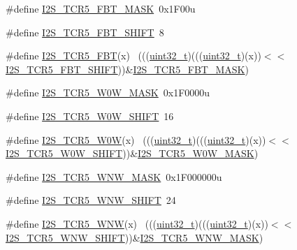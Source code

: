 \begin{DoxyCompactItemize}
\item 
\#define \hyperlink{group___i2_s___register___masks_ga95e32e5df1218cb76b09a99f46d9eca2}{I2\+S\+\_\+\+T\+C\+R5\+\_\+\+F\+B\+T\+\_\+\+M\+A\+SK}~0x1\+F00u
\item 
\#define \hyperlink{group___i2_s___register___masks_gaaeadb079b059ec5d832aa9bce021f0ab}{I2\+S\+\_\+\+T\+C\+R5\+\_\+\+F\+B\+T\+\_\+\+S\+H\+I\+FT}~8
\item 
\#define \hyperlink{group___i2_s___register___masks_ga4b64363766a6e27ad151e3f1c90eb537}{I2\+S\+\_\+\+T\+C\+R5\+\_\+\+F\+BT}(x)                                                ~(((\hyperlink{_p_e___types_8h_a33594304e786b158f3fb30289278f5af}{uint32\+\_\+t})(((\hyperlink{_p_e___types_8h_a33594304e786b158f3fb30289278f5af}{uint32\+\_\+t})(x))$<$$<$\hyperlink{group___i2_s___register___masks_gaaeadb079b059ec5d832aa9bce021f0ab}{I2\+S\+\_\+\+T\+C\+R5\+\_\+\+F\+B\+T\+\_\+\+S\+H\+I\+FT}))\&\hyperlink{group___i2_s___register___masks_ga95e32e5df1218cb76b09a99f46d9eca2}{I2\+S\+\_\+\+T\+C\+R5\+\_\+\+F\+B\+T\+\_\+\+M\+A\+SK})
\item 
\#define \hyperlink{group___i2_s___register___masks_ga8c6552a52f0e99068ae8869056e78ccb}{I2\+S\+\_\+\+T\+C\+R5\+\_\+\+W0\+W\+\_\+\+M\+A\+SK}~0x1\+F0000u
\item 
\#define \hyperlink{group___i2_s___register___masks_ga0b9f1161cd97d2be7e9ee7f680293e3d}{I2\+S\+\_\+\+T\+C\+R5\+\_\+\+W0\+W\+\_\+\+S\+H\+I\+FT}~16
\item 
\#define \hyperlink{group___i2_s___register___masks_gad188d773cebe6deabdceef93e5050282}{I2\+S\+\_\+\+T\+C\+R5\+\_\+\+W0W}(x)                                                ~(((\hyperlink{_p_e___types_8h_a33594304e786b158f3fb30289278f5af}{uint32\+\_\+t})(((\hyperlink{_p_e___types_8h_a33594304e786b158f3fb30289278f5af}{uint32\+\_\+t})(x))$<$$<$\hyperlink{group___i2_s___register___masks_ga0b9f1161cd97d2be7e9ee7f680293e3d}{I2\+S\+\_\+\+T\+C\+R5\+\_\+\+W0\+W\+\_\+\+S\+H\+I\+FT}))\&\hyperlink{group___i2_s___register___masks_ga8c6552a52f0e99068ae8869056e78ccb}{I2\+S\+\_\+\+T\+C\+R5\+\_\+\+W0\+W\+\_\+\+M\+A\+SK})
\item 
\#define \hyperlink{group___i2_s___register___masks_gac7d0e32e2822b95984bd4c98097848e0}{I2\+S\+\_\+\+T\+C\+R5\+\_\+\+W\+N\+W\+\_\+\+M\+A\+SK}~0x1\+F000000u
\item 
\#define \hyperlink{group___i2_s___register___masks_ga76459cafce1757f4ea37a3fca81514a7}{I2\+S\+\_\+\+T\+C\+R5\+\_\+\+W\+N\+W\+\_\+\+S\+H\+I\+FT}~24
\item 
\#define \hyperlink{group___i2_s___register___masks_ga6702fa197478e6dec76000e98c6eee75}{I2\+S\+\_\+\+T\+C\+R5\+\_\+\+W\+NW}(x)                                                ~(((\hyperlink{_p_e___types_8h_a33594304e786b158f3fb30289278f5af}{uint32\+\_\+t})(((\hyperlink{_p_e___types_8h_a33594304e786b158f3fb30289278f5af}{uint32\+\_\+t})(x))$<$$<$\hyperlink{group___i2_s___register___masks_ga76459cafce1757f4ea37a3fca81514a7}{I2\+S\+\_\+\+T\+C\+R5\+\_\+\+W\+N\+W\+\_\+\+S\+H\+I\+FT}))\&\hyperlink{group___i2_s___register___masks_gac7d0e32e2822b95984bd4c98097848e0}{I2\+S\+\_\+\+T\+C\+R5\+\_\+\+W\+N\+W\+\_\+\+M\+A\+SK})
$$
\end{DoxyCompactItemize}
